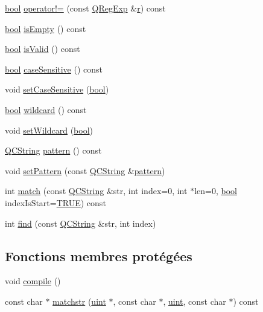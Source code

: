 \begin{DoxyCompactItemize}
\item 
\hyperlink{qglobal_8h_a1062901a7428fdd9c7f180f5e01ea056}{bool} \hyperlink{class_q_reg_exp_a9042e7c6e9848f9c6a7b354681a01f59}{operator!=} (const \hyperlink{class_q_reg_exp}{Q\+Reg\+Exp} \&\hyperlink{060__command__switch_8tcl_a0a0bd3dc69dd06934c4e6362155e0ace}{r}) const 
\item 
\hyperlink{qglobal_8h_a1062901a7428fdd9c7f180f5e01ea056}{bool} \hyperlink{class_q_reg_exp_a221555bd6dd36f5ccaa5e264a3bc7c25}{is\+Empty} () const 
\item 
\hyperlink{qglobal_8h_a1062901a7428fdd9c7f180f5e01ea056}{bool} \hyperlink{class_q_reg_exp_ae675599c16f7e9fceb93fe6ed0f2d7c1}{is\+Valid} () const 
\item 
\hyperlink{qglobal_8h_a1062901a7428fdd9c7f180f5e01ea056}{bool} \hyperlink{class_q_reg_exp_ae1d7417c0cea939823d1101da3a22dd5}{case\+Sensitive} () const 
\item 
void \hyperlink{class_q_reg_exp_a99dd9f410cfa14efda7990bac1fd089e}{set\+Case\+Sensitive} (\hyperlink{qglobal_8h_a1062901a7428fdd9c7f180f5e01ea056}{bool})
\item 
\hyperlink{qglobal_8h_a1062901a7428fdd9c7f180f5e01ea056}{bool} \hyperlink{class_q_reg_exp_a52445cdcf77f2396764c23dcfdcdd0f6}{wildcard} () const 
\item 
void \hyperlink{class_q_reg_exp_a706203a025db3f506cced8e34faa8d4e}{set\+Wildcard} (\hyperlink{qglobal_8h_a1062901a7428fdd9c7f180f5e01ea056}{bool})
\item 
\hyperlink{class_q_c_string}{Q\+C\+String} \hyperlink{class_q_reg_exp_a7351e1e57c360c96aaeb08e1e7411f7f}{pattern} () const 
\item 
void \hyperlink{class_q_reg_exp_ad40709cbfe75f759293e00142367e7cb}{set\+Pattern} (const \hyperlink{class_q_c_string}{Q\+C\+String} \&\hyperlink{class_q_reg_exp_a7351e1e57c360c96aaeb08e1e7411f7f}{pattern})
\item 
int \hyperlink{class_q_reg_exp_a6cbaefdcffaab3dfaa14f471479c547e}{match} (const \hyperlink{class_q_c_string}{Q\+C\+String} \&str, int index=0, int $\ast$len=0, \hyperlink{qglobal_8h_a1062901a7428fdd9c7f180f5e01ea056}{bool} index\+Is\+Start=\hyperlink{qglobal_8h_a04a6422a52070f0dc478693da640242b}{T\+R\+U\+E}) const 
\item 
int \hyperlink{class_q_reg_exp_af38e38dccf74a21a3c699cc203f19878}{find} (const \hyperlink{class_q_c_string}{Q\+C\+String} \&str, int index)
\end{DoxyCompactItemize}
\subsection*{Fonctions membres protégées}
\begin{DoxyCompactItemize}
\item 
void \hyperlink{class_q_reg_exp_a84ff8f5f1c6e54a303dfcbe1e61b7fe2}{compile} ()
\item 
const char $\ast$ \hyperlink{class_q_reg_exp_a9c93c3c0a426001c4925390369867616}{matchstr} (\hyperlink{qglobal_8h_a4d3943ddea65db7163a58e6c7e8df95a}{uint} $\ast$, const char $\ast$, \hyperlink{qglobal_8h_a4d3943ddea65db7163a58e6c7e8df95a}{uint}, const char $\ast$) const 
\end{DoxyCompactItemize}


